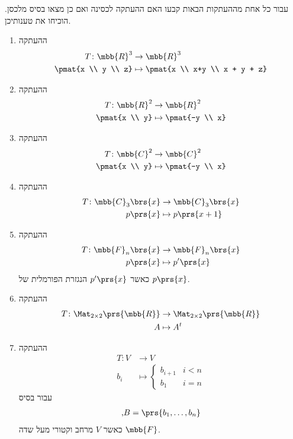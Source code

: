 \documentclass[a4paper,10pt,twoside,openany]{article}
\begin{document}
\begin{exercise}
עבור כל אחת מההעתקות הבאות קבעו האם ההעתקה לכסינה ואם כן מצאו בסיס מלכסן. הוכיחו את טענותיכן.
\begin{enumerate}
\item
ההעתקה
\begin{align*}
T \colon \mbb{R}^3 &\to \mbb{R}^3 \\
\pmat{x \\ y \\ z} &\mapsto \pmat{x \\ x+y \\ x + y + z}
\end{align*}
\item
ההעתקה
\begin{align*}
T \colon \mbb{R}^2 &\to \mbb{R}^2 \\
\pmat{x \\ y} &\mapsto \pmat{-y \\ x}
\end{align*}
\item
ההעתקה
\begin{align*}
T \colon \mbb{C}^2 &\to \mbb{C}^2 \\
\pmat{x \\ y} &\mapsto \pmat{-y \\ x}
\end{align*}
\item ההעתקה
\begin{align*}
T \colon \mbb{C}_3\brs{x} &\to \mbb{C}_3\brs{x} \\
p\prs{x} &\mapsto p\prs{x+1}
\end{align*}
\item ההעתקה
\begin{align*}
T \colon \mbb{F}_n\brs{x} &\to \mbb{F}_n\brs{x} \\
p\prs{x} &\mapsto p'\prs{x}
\end{align*}
כאשר
$p'\prs{x}$
הנגזרת הפורמלית של
$p\prs{x}$.
\item ההעתקה
\begin{align*}
T \colon \Mat_{2\times 2}\prs{\mbb{R}} &\to \Mat_{2 \times 2}\prs{\mbb{R}}\\
A &\mapsto A^t
\end{align*}
\item ההעתקה
\begin{align*}
T \colon V &\to V \\
b_i &\mapsto
\begin{cases}
b_{i+1} & i < n \\
b_1 & i = n
\end{cases}
\end{align*}
עבור בסיס
\begin{align*}
\text{,} B = \prs{b_1, \ldots, b_n}
\end{align*}
כאשר
$V$
מרחב וקטורי מעל שדה
$\mbb{F}$.
\end{enumerate}
\end{exercise}
\end{document}
